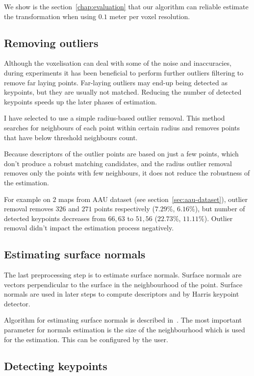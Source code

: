 We show is the section~\ref{chap:evaluation} that our algorithm can reliable estimate the transformation when using $0.1$ meter per voxel resolution.

\subsection{Removing outliers}
\label{sec:outlier-removal}

Although the voxelisation can deal with some of the noise and inaccuracies, during experiments it has been beneficial to perform further outliers filtering to remove far laying points. Far-laying outliers may end-up being detected as keypoints, but they are usually not matched. Reducing the number of detected keypoints speeds up the later phases of estimation.

I have selected to use a simple radius-based outlier removal. This method searches for neighbours of each point within certain radius and removes points that have below threshold neighbours count.

Because descriptors of the outlier points are based on just a few points, which don't produce a robust matching candidates, and the radius outlier removal removes only the points with few neighbours, it does not reduce the robustness of the estimation.

For example on $2$ maps from \gls{AAU} dataset (see section~\ref{sec:aau-dataset}), outlier removal removes $326$ and $271$ points respectively ($7.29\%$, $6.16\%$), but number of detected keypoints decreases from $66, 63$ to $51, 56$ ($22.73\%$, $11.11\%$). Outlier removal didn't impact the estimation process negatively.

\subsection{Estimating surface normals}
\label{sec:normal-estimation}

The last preprocessing step is to estimate surface normals. Surface normals are vectors perpendicular to the surface in the neighbourhood of the point. Surface normals are used in later steps to compute descriptors and by Harris keypoint detector.

Algorithm for estimating surface normals is described in~\citet{RusuDoctoralDissertation}. The most important parameter for normals estimation is the size of the neighbourhood which is used for the estimation. This can be configured by the user.

\subsection{Detecting keypoints}
\label{sec:detect-keypoints}

